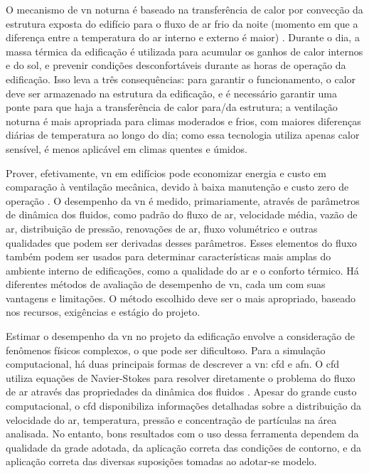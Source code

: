 O mecanismo de \acrlong{vn} noturna é baseado na transferência de calor por convecção da estrutura exposta do edifício para o fluxo de ar frio da noite (momento em que a diferença entre a temperatura do ar interno e externo é maior) \cite{Breesch2010}. Durante o dia, a massa térmica da	edificação é utilizada para acumular os ganhos de calor internos e do sol, e prevenir condições desconfortáveis durante as horas de operação da edificação.	
Isso leva a três consequências: para garantir o funcionamento, o calor deve ser armazenado na estrutura da edificação, e é necessário garantir uma ponte para que haja a transferência de calor para/da estrutura; a ventilação noturna é mais apropriada para climas moderados e frios, com maiores diferenças diárias de temperatura ao longo do dia; como essa tecnologia utiliza apenas calor sensível, é menos aplicável em climas quentes e úmidos.

Prover, efetivamente, \acrshort{vn} em edifícios pode economizar energia e custo em comparação à ventilação mecânica, devido à baixa manutenção e custo zero de operação \cite{Omrani2017}. O desempenho da \acrshort{vn} é medido, primariamente, através de parâmetros de dinâmica dos fluidos, como padrão do fluxo de ar, velocidade média, vazão de ar, distribuição de pressão, renovações de ar, fluxo volumétrico e outras qualidades que podem ser derivadas desses parâmetros.
Esses elementos do fluxo também podem ser usados para determinar características mais amplas do ambiente interno de edificações, como a qualidade do ar e o conforto térmico. Há diferentes métodos de avaliação de desempenho de \acrshort{vn}, cada um com suas vantagens e limitações. O método escolhido deve ser o mais apropriado, baseado nos recursos, exigências e estágio do projeto.

Estimar o desempenho da \acrshort{vn} no projeto da edificação envolve a consideração de fenômenos físicos complexos, o que pode ser dificultoso. Para a simulação computacional, há duas principais formas de descrever a \acrlong{vn}: \acrfull{cfd} e \acrfull{afn}. O \acrshort{cfd} utiliza equações de Navier-Stokes para resolver diretamente o problema do fluxo de ar através das propriedades da dinâmica dos fluidos \cite{Arendt2017}. Apesar do grande custo computacional, o \acrshort{cfd} disponibiliza informações detalhadas sobre a distribuição da velocidade do ar, temperatura, pressão e concentração de partículas na área analisada. No entanto, bons resultados com o uso dessa ferramenta dependem da qualidade da grade adotada, da aplicação correta das condições de contorno, e da aplicação correta das diversas suposições tomadas ao adotar-se modelo. 

